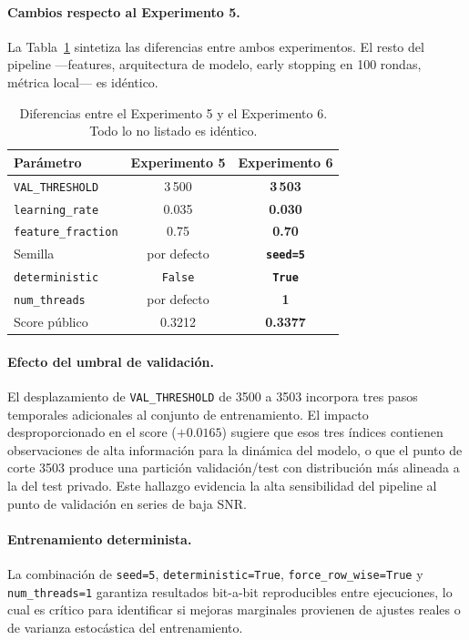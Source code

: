 \documentclass{article}
\begin{document}
\paragraph{Cambios respecto al Experimento 5.}
La Tabla~\ref{tab:diff_exp5_exp6} sintetiza las diferencias entre ambos experimentos. El resto del pipeline —features, arquitectura de modelo, early stopping en 100 rondas, métrica local— es idéntico.

\begin{table}[h!]
  \caption{Diferencias entre el Experimento 5 y el Experimento 6. Todo lo no listado es idéntico.}
  \label{tab:diff_exp5_exp6}
  \centering
  \begin{tabular}{lcc}
    \toprule
    Parámetro & Experimento 5 & Experimento 6 \\
    \midrule
    \texttt{VAL\_THRESHOLD}     & 3\,500 & \textbf{3\,503} \\
    \texttt{learning\_rate}     & 0.035  & \textbf{0.030}  \\
    \texttt{feature\_fraction}  & 0.75   & \textbf{0.70}   \\
    Semilla                     & por defecto & \textbf{\texttt{seed=5}} \\
    \texttt{deterministic}      & \texttt{False} & \textbf{\texttt{True}} \\
    \texttt{num\_threads}       & por defecto & \textbf{1} \\
    Score público               & 0.3212 & \textbf{0.3377} \\
    \bottomrule
  \end{tabular}
\end{table}

\paragraph{Efecto del umbral de validación.}
El desplazamiento de \texttt{VAL\_THRESHOLD} de 3500 a 3503 incorpora tres pasos temporales adicionales al conjunto de entrenamiento. El impacto desproporcionado en el score ($+0.0165$) sugiere que esos tres índices contienen observaciones de alta información para la dinámica del modelo, o que el punto de corte 3503 produce una partición validación/test con distribución más alineada a la del test privado. Este hallazgo evidencia la alta sensibilidad del pipeline al punto de validación en series de baja SNR.

\paragraph{Entrenamiento determinista.}
La combinación de \texttt{seed=5}, \texttt{deterministic=True}, \texttt{force\_row\_wise=True} y \texttt{num\_threads=1} garantiza resultados bit-a-bit reproducibles entre ejecuciones, lo cual es crítico para identificar si mejoras marginales provienen de ajustes reales o de varianza estocástica del entrenamiento.
\end{document}
